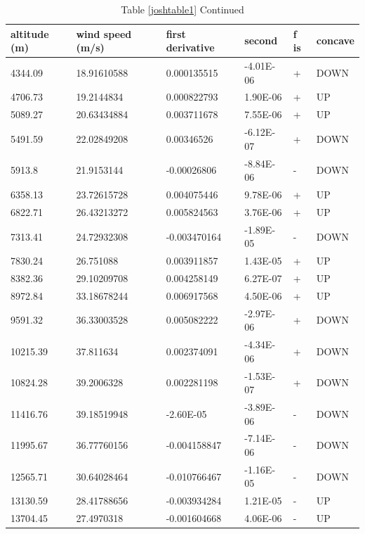 \documentclass{article}
\begin{document}
\begin{table}[]
\centering
\caption{Table \ref{joshtable1} Continued}
\label{joshtable2}
\begin{tabular}{@{}llllll@{}}
\toprule
altitude (m) & wind speed (m/s) & first derivative & second    & f is & concave \\ \midrule
4344.09      & 18.91610588      & 0.000135515      & -4.01E-06 & +    & DOWN    \\
4706.73      & 19.2144834       & 0.000822793      & 1.90E-06  & +    & UP      \\
5089.27      & 20.63434884      & 0.003711678      & 7.55E-06  & +    & UP      \\
5491.59      & 22.02849208      & 0.00346526       & -6.12E-07 & +    & DOWN    \\
5913.8       & 21.9153144       & -0.00026806      & -8.84E-06 & -    & DOWN    \\
6358.13      & 23.72615728      & 0.004075446      & 9.78E-06  & +    & UP      \\
6822.71      & 26.43213272      & 0.005824563      & 3.76E-06  & +    & UP      \\
7313.41      & 24.72932308      & -0.003470164     & -1.89E-05 & -    & DOWN    \\
7830.24      & 26.751088        & 0.003911857      & 1.43E-05  & +    & UP      \\
8382.36      & 29.10209708      & 0.004258149      & 6.27E-07  & +    & UP      \\
8972.84      & 33.18678244      & 0.006917568      & 4.50E-06  & +    & UP      \\
9591.32      & 36.33003528      & 0.005082222      & -2.97E-06 & +    & DOWN    \\
10215.39     & 37.811634        & 0.002374091      & -4.34E-06 & +    & DOWN    \\
10824.28     & 39.2006328       & 0.002281198      & -1.53E-07 & +    & DOWN    \\
11416.76     & 39.18519948      & -2.60E-05        & -3.89E-06 & -    & DOWN    \\
11995.67     & 36.77760156      & -0.004158847     & -7.14E-06 & -    & DOWN    \\
12565.71     & 30.64028464      & -0.010766467     & -1.16E-05 & -    & DOWN    \\
13130.59     & 28.41788656      & -0.003934284     & 1.21E-05  & -    & UP      \\
13704.45     & 27.4970318       & -0.001604668     & 4.06E-06  & -    & UP      \\

\end{tabular}
\end{table}
\end{document}
